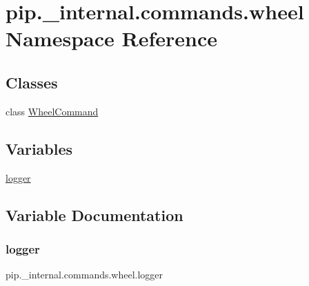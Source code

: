 \hypertarget{namespacepip_1_1__internal_1_1commands_1_1wheel}{}\section{pip.\+\_\+internal.\+commands.\+wheel Namespace Reference}
\label{namespacepip_1_1__internal_1_1commands_1_1wheel}
\subsection*{Classes}
\begin{DoxyCompactItemize}
\item 
class \hyperlink{classpip_1_1__internal_1_1commands_1_1wheel_1_1WheelCommand}{Wheel\+Command}
\end{DoxyCompactItemize}
\subsection*{Variables}
\begin{DoxyCompactItemize}
\item 
\hyperlink{namespacepip_1_1__internal_1_1commands_1_1wheel_a43bc27887d0eae57649b5f12b6802297}{logger}
\end{DoxyCompactItemize}


\subsection{Variable Documentation}
\mbox{\label{namespacepip_1_1__internal_1_1commands_1_1wheel_a43bc27887d0eae57649b5f12b6802297}} 
\subsubsection{\texorpdfstring{logger}{logger}}
{\footnotesize\ttfamily pip.\+\_\+internal.\+commands.\+wheel.\+logger}

